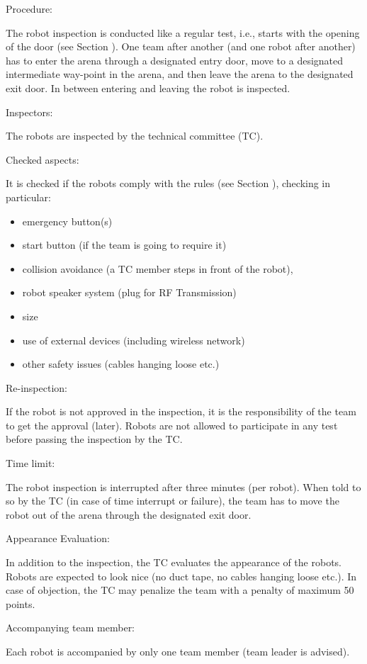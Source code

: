 \begin{enumerate}
	{\bf\item Procedure:} The robot inspection is conducted like a regular test, i.e., starts with the opening of the door (see Section ). One team after another (and one robot after another) has to enter the arena through a designated entry door, move to a designated intermediate way-point in the arena, and then leave the arena to the designated exit door. In between entering and leaving the robot is inspected.
	{\bf\item Inspectors:} The robots are inspected by the technical committee (TC).
	{\bf\item Checked aspects:} It is checked if the robots comply with the rules (see Section ), checking in particular:
	\begin{itemize}
		\item emergency button(s)
		\item start button (if the team is going to require it)
		\item collision avoidance (a TC member steps in front of the robot),
		\item robot speaker system (plug for RF Transmission)
		\item size
		\item use of external devices (including wireless network)
		\item other safety issues (cables hanging loose etc.)
	\end{itemize}
	{\bf\item Re-inspection:} If the robot is not approved in the inspection, it is the responsibility of the team to get the approval (later). Robots are not allowed to participate in any test before passing the inspection by the TC.
	{\bf\item Time limit:} The robot inspection is interrupted after three minutes (per robot). When told to so by the TC (in case of time interrupt or failure), the team has to move the robot out of the arena through the designated exit door.
	{\bf\item Appearance Evaluation:} In addition to the inspection, the TC evaluates the appearance of the robots. Robots are expected to look nice (no duct tape, no cables hanging loose etc.). In case of objection, the TC may penalize the team with a penalty of maximum 50 points.
	{\bf\item Accompanying team member:} Each robot is accompanied by only one team member (team leader is advised).

\end{enumerate}
